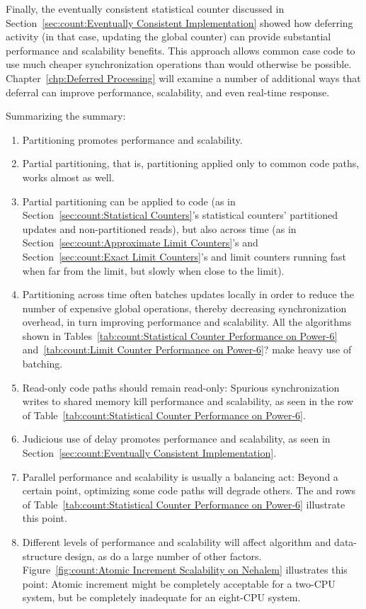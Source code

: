 Finally, the eventually consistent statistical counter discussed in
Section~\ref{sec:count:Eventually Consistent Implementation}
showed how deferring activity (in that case, updating the global
counter) can provide substantial performance and scalability benefits.
This approach allows common case code to use much cheaper synchronization
operations than would otherwise be possible.
Chapter~\ref{chp:Deferred Processing} will examine a number of additional
ways that deferral can improve performance, scalability, and even
real-time response.

Summarizing the summary:

\begin{enumerate}
\item	Partitioning promotes performance and scalability.
\item	Partial partitioning, that is, partitioning applied only to
	common code paths, works almost as well.
\item	Partial partitioning can be applied to code (as in
	Section~\ref{sec:count:Statistical Counters}'s statistical
	counters' partitioned updates and non-partitioned reads), but also
	across time (as in
	Section~\ref{sec:count:Approximate Limit Counters}'s and
	Section~\ref{sec:count:Exact Limit Counters}'s and
	limit counters running fast when far from
	the limit, but slowly when close to the limit).
\item	Partitioning across time often batches updates locally
	in order to reduce the number of expensive global operations,
	thereby decreasing synchronization overhead, in turn
	improving performance and scalability.
	All the algorithms shown in
	Tables~\ref{tab:count:Statistical Counter Performance on Power-6}
	and~\ref{tab:count:Limit Counter Performance on Power-6}?
	make heavy use of batching.
\item	Read-only code paths should remain read-only:  Spurious
	synchronization writes to shared memory kill performance
	and scalability, as seen in the  row of
	Table~\ref{tab:count:Statistical Counter Performance on Power-6}.
\item	Judicious use of delay promotes performance and scalability, as
	seen in Section~\ref{sec:count:Eventually Consistent Implementation}.
\item	Parallel performance and scalability is usually a balancing act:
	Beyond a certain point, optimizing some code paths will degrade
	others.
	The  and  rows of
	Table~\ref{tab:count:Statistical Counter Performance on Power-6}
	illustrate this point.
\item	Different levels of performance and scalability will affect
	algorithm and data-structure design, as do a large number of
	other factors.
	Figure~\ref{fig:count:Atomic Increment Scalability on Nehalem}
	illustrates this point:  Atomic increment might be completely
	acceptable for a two-CPU system, but be completely inadequate for an
	eight-CPU system.
\end{enumerate}

